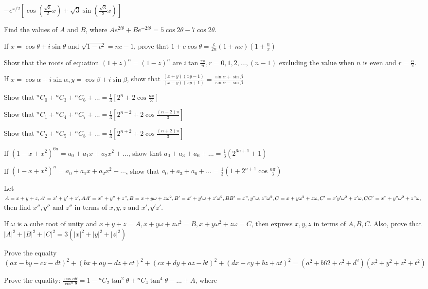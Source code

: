   $-e^{x/2}\left[\cos\left(\frac{\sqrt{3}}{2}x\right) + \sqrt{3}\sin\left(\frac{\sqrt{3}}{2}x\right)\right]$
\item Find the values of $A$ and $B$, where $Ae^{2i\theta} + Be^{-2i\theta} = 5\cos2\theta - 7\cos2\theta$.
\item If $x = \cos\theta + i\sin\theta$ and $\sqrt{1 - c^2} = nc - 1$, prove that $1 + c\cos\theta = \frac{c}{2n}(1 + nx)(1 +
  \frac{n}{x})$
\item Show that the roots of equation $(1 + z)^n = (1 - z)^n$ are $i\tan\frac{r\pi}{n}, r = 0, 1, 2, \ldots, (n - 1)$ excluding the
  value when $n$ is even and $r = \frac{n}{2}$.
\item If $x = \cos\alpha + i\sin\alpha, y = \cos\beta + i\sin\beta$, show that $\frac{(x + y)(xy - 1)}{(x - y)(xy + 1)} =
  \frac{\sin\alpha + \sin\beta}{\sin\alpha - \sin\beta}$
\item Show that ${}^nC_0 + {}^nC_3 + {}^nC_6 + \ldots = \frac{1}{3}\left[2^n + 2\cos\frac{n\pi}{3}\right]$
\item Show that ${}^nC_1 + {}^nC_4 + {}^nC_7 + \ldots = \frac{1}{3}\left[2^{n - 2} + 2\cos\frac{(n - 2)\pi}{3}\right]$
\item Show that ${}^nC_2 + {}^nC_5 + {}^nC_8 + \ldots = \frac{1}{3}\left[2^{n + 2} + 2\cos\frac{(n + 2)\pi}{3}\right]$
\item If $(1 - x + x^2)^{6n} = a_0 + a_1x + a_2x^2 + \ldots$, show that $a_0 + a_3 + a_6 + \ldots = \frac{1}{3}(2^{6n + 1} + 1)$
\item If $(1 - x + x^2)^n = a_0 + a_1x + a_2x^2 + \ldots$, show that $a_0 + a_3 + a_6 + \ldots = \frac{1}{3}\left(1 + 2^{n +
  1}\cos\frac{n\pi}{3}\right)$
\item Let $A = x + y + z, A' = x' + y' + z', AA' = x" + y" + z", B = x + y\omega + z\omega^2, B' = x' + y'\omega + z'\omega^2, BB'
  = x", y"\omega, z"\omega^2, C = x + y\omega^2 + z\omega, C' = x' y'\omega^2 + z'\omega, CC' = x" + y"\omega^2 + z"\omega,$ then
  find $x'', y''$ and $z''$ in terms of $x, y, z$ and $x', y' z'$.
\item If $\omega$ is a cube root of unity and $x + y + z = A, x + y\omega + z\omega^2 = B, x + y\omega^2 + z\omega = C$, then
  express $x, y, z$ in terms of $A, B, C$. Also, prove that $|A|^2 + |B|^2 + |C|^2 = 3(|x|^2 + |y|^2 + |z|^2)$
\item Prove the equaity $(ax - by - cz - dt)^2 + (bx + ay - dz + ct)^2 + (cx + dy + az - bt)^2 + (dx - cy + bz + at)^2 = (a^2 + b62
  + c^2 + d^2)(x^2 + y^2 + z^2 + t^2)$
\item Prove the equality: $\frac{\cos n\theta}{\cos^n\theta} = 1 - {}^nC_2\tan^2\theta + {}^nC_4\tan^4\theta - \ldots + A$, where
